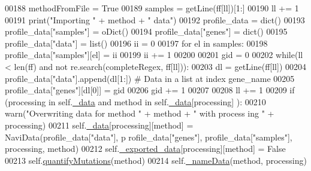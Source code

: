 \begin{DoxyCode}
00188                         methodFromFile = \textcolor{keyword}{True}
00189                     samples = getLine(ff[ll])[1:]
00190                     ll += 1
00191                 \textcolor{keywordflow}{print}(\textcolor{stringliteral}{"Importing "} + method + \textcolor{stringliteral}{" data"})
00192                 profile\_data = dict()
00193                 profile\_data[\textcolor{stringliteral}{"samples"}] = oDict()
00194                 profile\_data[\textcolor{stringliteral}{"genes"}] = dict()
00195                 profile\_data[\textcolor{stringliteral}{"data"}] = list()
00196                 ii = 0
00197                 \textcolor{keywordflow}{for} el \textcolor{keywordflow}{in} samples:
00198                     profile\_data[\textcolor{stringliteral}{"samples"}][el] = ii
00199                     ii += 1
00200 
00201                 gid = 0
00202                 \textcolor{keywordflow}{while}(ll < len(ff) \textcolor{keywordflow}{and} \textcolor{keywordflow}{not} re.search(completeRegex, ff[ll])):
00203                     dl = getLine(ff[ll])
00204                     profile\_data[\textcolor{stringliteral}{"data"}].append(dl[1:]) \textcolor{comment}{# Data in a list at index
       gene\_name}
00205                     profile\_data[\textcolor{stringliteral}{"genes"}][dl[0]] = gid
00206                     gid += 1
00207 
00208                     ll += 1
00209                 \textcolor{keywordflow}{if} (processing \textcolor{keywordflow}{in} self.\hyperlink{classnavicom_1_1navicom_1_1NaviCom_a407b2b5c30a5652ee85c4be54b3e6679}{_data} \textcolor{keywordflow}{and} method \textcolor{keywordflow}{in} self.\hyperlink{classnavicom_1_1navicom_1_1NaviCom_a407b2b5c30a5652ee85c4be54b3e6679}{_data}[processing]
      ):
00210                     warn(\textcolor{stringliteral}{"Overwriting data for method "} + method + \textcolor{stringliteral}{" with process
      ing "} + processing)
00211                 self.\hyperlink{classnavicom_1_1navicom_1_1NaviCom_a407b2b5c30a5652ee85c4be54b3e6679}{_data}[processing][method] = NaviData(profile\_data[\textcolor{stringliteral}{"data"}], p
      rofile\_data[\textcolor{stringliteral}{"genes"}], profile\_data[\textcolor{stringliteral}{"samples"}], processing, method)
00212                 self.\hyperlink{classnavicom_1_1navicom_1_1NaviCom_ab7328fbbe89a1b3cb2db8c3d456d958f}{_exported_data}[processing][method] = \textcolor{keyword}{False}
00213                 self.\hyperlink{classnavicom_1_1navicom_1_1NaviCom_a5314c49d6b9749693519a4a86cbfde71}{quantifyMutations}(method)
00214                 self.\hyperlink{classnavicom_1_1navicom_1_1NaviCom_a140128d0fd12930347cc2375c154072d}{_nameData}(method, processing)

\end{DoxyCode}
